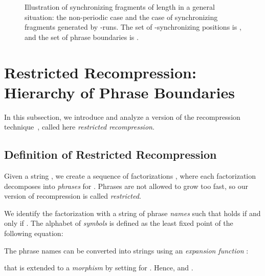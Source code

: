 \documentclass[a4paper]{article}
\theoremstyle{definition}
\theoremstyle{remark}
\begin{document}
\begin{figure}[h]
 \caption{
  Illustration of synchronizing fragments of length  in a general situation: the non-periodic case and the case of synchronizing fragments generated by -runs.
  The set of -synchronizing positions is , and the set 
  of phrase boundaries is .
}\label{fig:general}
\end{figure}

 
\section{Restricted Recompression: Hierarchy of Phrase Boundaries}\label{sec:recompression}

\newcommand{\Symb}{\mathbf{S}}
\newcommand{\Act}{\mathbf{A}}
\newcommand{\Left}{\mathbf{L}}
\newcommand{\Right}{\mathbf{R}}
\newcommand{\rle}{\mathsf{\mathbf{RunShrink}}}
\newcommand{\pc}{\mathsf{\mathbf{PairShrink}}}
\newcommand{\Zp}{\mathbb{Z}_{+}}

In this subsection, we introduce and analyze a version of the recompression technique~\cite{DBLP:journals/jacm/Jez16}, called here \emph{restricted recompression}.

\subsection{Definition of Restricted Recompression}
Given a string , we create a sequence of factorizations ,
where each factorization  decomposes  into  \emph{phrases}  for .
Phrases are not allowed to grow too fast, so our version of recompression is called \emph{restricted}.

We identify the factorization  with a string  of phrase \emph{names} such that  holds if and only if . The alphabet  of \emph{symbols} is defined as the least fixed point of the following equation:
 
The phrase names  can be converted into strings using an \emph{expansion function} :

that is extended to a \emph{morphism}  by setting  for .
Hence,  and .
\end{document}
